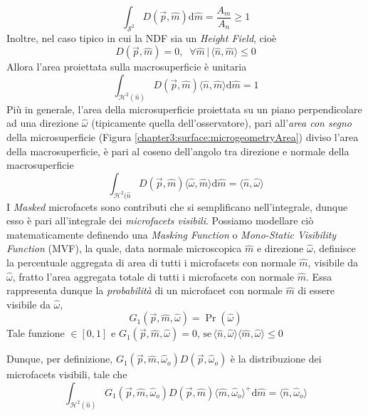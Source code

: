 \begin{equation}
	\int_{\mathcal{S}^2}D(\vec{p},\hat{m})\mathrm{d}\hat{m} = \frac{A_m}{A_n}\geq1
\end{equation}
Inoltre, nel caso tipico in cui la NDF sia un \textit{Height Field}, cio\`e 
\begin{equation}
	D(\vec{p},\hat{m})=0,\;\;\forall\hat{m}\,\vert\,\langle\hat{n},\hat{m}\rangle\leq0
\end{equation}
Allora l'area proiettata sulla macrosuperficie \`e unitaria
\begin{equation}
	\int_{\mathcal{H}^2(\hat{n})}D(\vec{p},\hat{m})\langle\hat{n},\hat{m}\rangle\mathrm{d}\hat{m}=1
\end{equation}
Pi\`u in generale, l'area della microsuperficie proiettata su un piano perpendicolare ad una direzione $\hat{\omega}$ 
(tipicamente quella dell'osservatore), pari all'\textit{area con segno} della microsuperficie (Figura \ref{chapter3:surface:microgeometryArea}) 
diviso l'area della macrosuperficie, \`e pari al coseno dell'angolo tra direzione e normale della macrosuperficie
\begin{equation}
	\int_{\mathcal{H}^2(\hat{n}}D(\vec{p},\hat{m})\langle\hat{\omega},\hat{m}\rangle\mathrm{d}\hat{m}=\langle\hat{n},\hat{\omega}\rangle
\end{equation}
I \textit{Masked} microfacets sono contributi che si semplificano nell'integrale, dunque esso \`e pari all'integrale dei \textit{microfacets visibili}.
Possiamo modellare ci\`o matematicamente definendo una \textit{Masking Function} o \textit{Mono-Static Visibility Function} (MVF), la quale, data 
normale microscopica $\hat{m}$ e direzione $\hat{\omega}$, definisce la percentuale aggregata di area di tutti i microfacets con normale $\hat{m}$,
visibile da $\hat{\omega}$, fratto l'area aggregata totale di tutti i microfacets con normale $\hat{m}$. Essa rappresenta dunque la 
\textit{probabilit\`a} di un microfacet con normale $\hat{m}$ di essere visibile da $\hat{\omega}$, 
\begin{equation}
	G_1(\vec{p},\hat{m},\hat{\omega}) = \Pr(\hat{\omega})
\end{equation}
Tale funzione $\in[0,1]$ e $G_1(\vec{p},\hat{m},\hat{\omega})=0,\,\mathrm{se}\,%
	\langle\hat{n},\hat{\omega}\rangle\langle\hat{m},\hat{\omega}\rangle\leq0$\par
Dunque, per definizione, $G_1(\vec{p},\hat{m},\hat{\omega}_o)D(\vec{p},\hat{\omega}_o)$ \`e la distribuzione dei microfacets visibili, tale che
\begin{equation}
	\int_{\mathcal{H}^2(\hat{n})}G_1(\vec{p},\hat{m},\hat{\omega}_o)D(\vec{p},\hat{m})\langle\hat{m},\hat{\omega}_o\rangle^+\mathrm{d}\hat{m}%
		=\langle\hat{n},\hat{\omega}_o\rangle
\end{equation}
